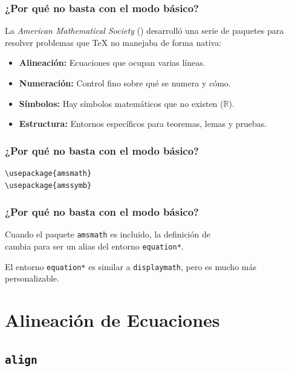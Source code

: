 \documentclass[12pt,aspectratio=169,ignorenonframetext]{ltxbeamer}
\begin{document}
\begin{frame}
\frametitle{¿Por qué no basta con el modo básico?}
La \textit{American Mathematical Society} () desarrolló una serie de paquetes para resolver problemas que {\lmr\TeX} no manejaba de forma nativa:

\bigskip\pause

\begin{itemize}[<+->]
    \item \textbf{Alineación:} Ecuaciones que ocupan varias líneas.
    \item \textbf{Numeración:} Control fino sobre qué se numera y cómo.
    \item \textbf{Símbolos:} Hay símbolos matemáticos que no existen (\(\mathbb{R}\)).
    \item \textbf{Estructura:} Entornos específicos para teoremas, lemas y pruebas.
\end{itemize}
\end{frame}





\begin{frame}[fragile]
\frametitle{¿Por qué no basta con el modo básico?}
\begin{verbatim}
\usepackage{amsmath}
\usepackage{amssymb}
\end{verbatim}
\end{frame}





\begin{frame}[fragile]
\frametitle{¿Por qué no basta con el modo básico?}

Cuando el paquete \texttt{amsmath} es incluido, la definición de \texttt{\[\]} cambia para ser un alias del entorno \texttt{equation*}.

El entorno \texttt{equation*} es similar a \texttt{displaymath}, pero es mucho más personalizable.
\end{frame}





\section{Alineación de Ecuaciones}


\subsection{\texttt{align}}
\end{document}
